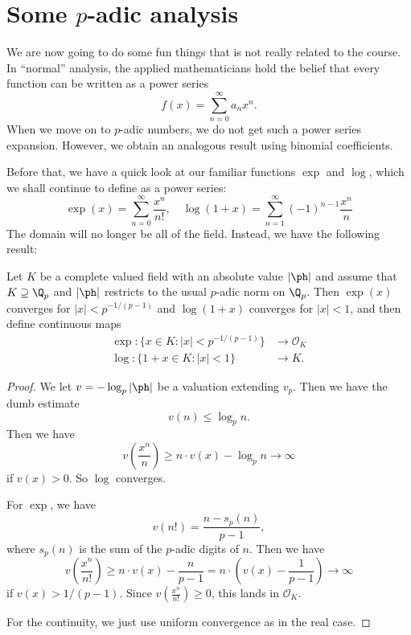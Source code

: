 \documentclass[a4paper]{article}
\begin{document}
\section{Some \texorpdfstring{$p$}{p}-adic analysis}
We are now going to do some fun things that is not really related to the course. In ``normal'' analysis, the applied mathematicians hold the belief that every function can be written as a power series
\[
  f(x) = \sum_{n = 0}^\infty a_n x^n.
\]
When we move on to $p$-adic numbers, we do not get such a power series expansion. However, we obtain an analogous result using binomial coefficients.

Before that, we have a quick look at our familiar functions $\exp$ and $\log$, which we shall continue to define as a power series:
\[
  \exp(x) = \sum_{n = 0}^\infty \frac{x^n}{n!},\quad \log(1 + x) = \sum_{n = 1}^\infty (-1)^{n - 1}\frac{x^n}{n}
\]
The domain will no longer be all of the field. Instead, we have the following result:
\begin{prop}
  Let $K$ be a complete valued field with an absolute value $|\ph|$ and assume that $K \supseteq \Q_p$ and $|\ph|$ restricts to the usual $p$-adic norm on $\Q_p$. Then $\exp(x)$ converges for $|x| < p^{-1/(p - 1)}$ and $\log(1 + x)$ converges for $|x| < 1$, and then define continuous maps
  \begin{align*}
    \exp: \{x \in K: |x| < p^{-1/(p - 1)}\} &\to \mathcal{O}_K\\
    \log: \{1 + x \in K: |x| < 1 \} &\to K.
  \end{align*}
\end{prop}

\begin{proof}
  We let $v = -\log_p |\ph|$ be a valuation extending $v_p$. Then we have the dumb estimate
  \[
    v(n) \leq \log_p n.
  \]
  Then we have
  \[
    v\left(\frac{x^n}{n}\right) \geq n \cdot v(x) - \log_p n \to \infty
  \]
  if $v(x) > 0$. So $\log$ converges.

  For $\exp$, we have
  \[
    v(n!) = \frac{n - s_p(n)}{p - 1},
  \]
  where $s_p(n)$ is the sum of the $p$-adic digits of $n$. Then we have
  \[
    v\left(\frac{x^n}{n!}\right) \geq n\cdot v(x) - \frac{n}{p - 1} = n\cdot\left(v(x) - \frac{1}{p - 1}\right)\to \infty
  \]
  if $v(x) > 1/(p - 1)$. Since $v\left(\frac{x^n}{n!}\right) \geq 0$, this lands in $\mathcal{O}_K$.

  For the continuity, we just use uniform convergence as in the real case.
\end{proof}
\end{document}
